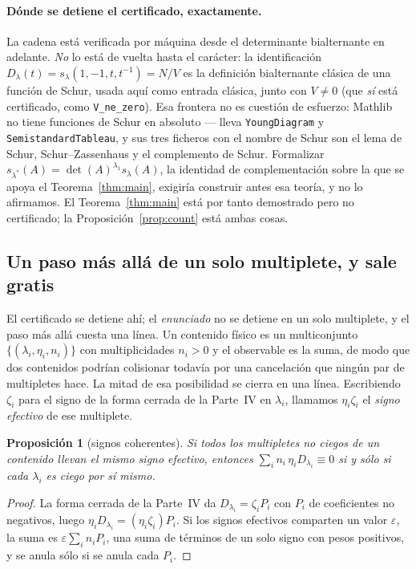 \documentclass[11pt,a4paper]{article}
\newtheorem{proposition}{Proposición}
\begin{document}
\paragraph{Dónde se detiene el certificado, exactamente.} La cadena está verificada por máquina desde
el determinante bialternante en adelante. \emph{No} lo está de vuelta hasta el carácter: la
identificación $D_\lambda(t)=s_\lambda(1,-1,t,t^{-1})=N/V$ es la definición bialternante clásica de
una función de Schur, usada aquí como entrada clásica, junto con $V\ne0$ (que \emph{sí} está
certificado, como \texttt{V\_ne\_zero}). Esa frontera no es cuestión de esfuerzo: Mathlib~\cite{Mathlib}
no tiene funciones de Schur en absoluto --- lleva \texttt{YoungDiagram} y
\texttt{SemistandardTableau}, y sus tres ficheros con el nombre de Schur son el lema de Schur,
Schur--Zassenhaus y el complemento de Schur. Formalizar
$s_{\lambda^*}(A)=\det(A)^{\lambda_1}s_\lambda(A)$, la identidad de complementación sobre la que se
apoya el Teorema~\ref{thm:main}, exigiría construir antes esa teoría, y no lo afirmamos. El
Teorema~\ref{thm:main} está por tanto demostrado pero no certificado; la
Proposición~\ref{prop:count} está ambas cosas.

\subsection*{Un paso más allá de un solo multiplete, y sale gratis}

El certificado se detiene ahí; el \emph{enunciado} no se detiene en un solo multiplete, y el paso más
allá cuesta una línea. Un contenido físico es un multiconjunto
$\{(\lambda_i,\eta_i,n_i)\}$ con multiplicidades $n_i>0$ y el observable es la suma, de modo que dos
contenidos podrían colisionar todavía por una cancelación que ningún par de multipletes hace. La
mitad de esa posibilidad se cierra en una línea. Escribiendo $\zeta_i$ para el signo de la forma
cerrada de la Parte~IV en $\lambda_i$, llamamos $\eta_i\zeta_i$ el \emph{signo efectivo} de ese
multiplete.

\begin{proposition}[signos coherentes]\label{prop:frust}
Si todos los multipletes no ciegos de un contenido llevan el mismo signo efectivo, entonces
$\sum_i n_i\,\eta_i D_{\lambda_i}\equiv0$ si y sólo si cada $\lambda_i$ es ciego por sí mismo.
\end{proposition}

\begin{proof}
La forma cerrada de la Parte~IV da $D_{\lambda_i}=\zeta_i P_i$ con $P_i$ de coeficientes no
negativos, luego $\eta_iD_{\lambda_i}=(\eta_i\zeta_i)P_i$. Si los signos efectivos comparten un
valor $\varepsilon$, la suma es $\varepsilon\sum_i n_iP_i$, una suma de términos de un solo signo con
pesos positivos, y se anula sólo si se anula cada $P_i$.
\end{proof}
\end{document}
